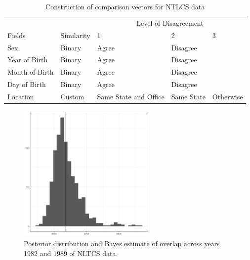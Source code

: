 \documentclass[ba]{imsart}
\begin{document}
	\begin{table}
		\centering
		\begin{tabular}[t]{lllll}
			\hline
			\multicolumn{2}{c}{ } & \multicolumn{3}{c}{Level of Disagreement} \\
			\cline{3-5}
			Fields & Similarity & 1 & 2 & 3\\
			\hline
			Sex & Binary & Agree & Disagree & \\
			Year of Birth & Binary & Agree & Disagree & \\
			Month of Birth & Binary & Agree & Disagree & \\
			Day of Birth & Binary & Agree & Disagree & \\
			Location & Custom & Same State and Office & Same State & Otherwise \\
			\hline
		\end{tabular}
		\caption{Construction of comparison vectors for NTLCS data}\label{Tab:nltcs-comparisons}
	\end{table}
	
	\begin{figure}[h]
		\begin{center}
			\includegraphics[width=0.6\textwidth]{../notes/figures/nltcs/overlap_posterior4}
			\caption{Posterior distribution and Bayes estimate of overlap across years 1982 and 1989 of NLTCS data.}
			\label{fig:nltcs-overlap-plot}
		\end{center}
	\end{figure}
	
\end{document}
